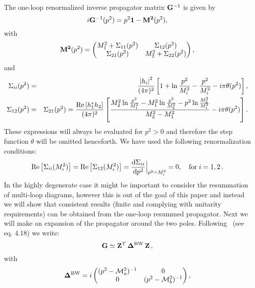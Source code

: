 \documentclass[11pt,a4paper]{article}
\providecommand{\dif}[0]{\mathrm{d}}
\providecommand{\abss}[1]{\left\lvert #1 \right\rvert^2}
\providecommand{\mire}[1]{{\rm Re} \left[ #1 \right]}
\providecommand{\cpm}[0]{\mathcal{M}}
\begin{document}
The one-loop renormalized inverse propagator matrix ${\bf G}^{-1}$ is given by 
 \begin{equation}
 \label{equation_Gdef}
 i {\bf G}^{-1}(p^2) = p^2 {\bf 1} - {\bf M^2}(p^2),
 \end{equation}
 with
 \begin{equation}
 {\bf M^2}(p^2)= 
\begin{pmatrix}
M_1^2 + \Sigma_{11}(p^2)  & \Sigma_{12}(p^2) \\
\Sigma_{21}(p^2)  & M_2^2 + \Sigma_{22}(p^2) 
\end{pmatrix},
\end{equation}
and
\begin{eqnarray}
\Sigma_{ii}(p^2)&=&\frac{\abss{h_i}}{(4\pi)^2} \left[1 + \ln \frac{p^2}{M_i^2} - \frac{p^2}{M_i^2} - i \pi \theta(p^2)\right], \\
\label{equation_sigma12}
\Sigma_{12}(p^2)&=&\Sigma_{21}(p^2)=\frac{\mire{h_1^* h_2}}{(4\pi)^2} \left[\frac{M_2^2 \ln \frac{p^2}{M_1^2} - M_1^2 \ln \frac{p^2}{M_2^2} - p^2 \ln \frac{M_2^2}{M_1^2}}{M_2^2-M_1^2} - i \pi \theta(p^2)\right] .
\end{eqnarray}
 These expressions will always be evaluated for $p^2 > 0$ and therefore the step function $\theta$ will be omitted henceforth. We have used the following renormalization conditions:
 \begin{equation*}
 \mire{\Sigma_{ii}(M_i^2)} = \mire{\Sigma_{12}(M_i^2)} = \frac{\dif \Sigma_{ii}}{\dif p^2}\Bigr\rvert_{p^2=M_i^2} = 0, \quad {\rm for} \; i=1,2\, . \\
\end{equation*}
In the highly degenerate case it might be important to consider the resummation of multi-loop diagrams, however this is out of the goal of this paper and instead we will show that consistent results (finite and complying with unitarity requirements) can be obtained from the one-loop resummed propagator.
Next we will make an expansion of the propagator around the two poles.
 Following~\cite{fuchs16} (see eq. 4.18) we write:
\begin{equation}
\label{equation_gaprox}
{\bf G} \simeq {\bf Z}^{T} \, {\bf \Delta}^{\rm BW} \, {\bf Z} \, ,
\end{equation}
with
\begin{equation}
\label{equation_bw}
{\bf \Delta}^{\rm BW} = i
\begin{pmatrix}
(p^2 - \cpm_{a}^2)^{-1} & 0 \\
0 & (p^2 - \cpm_{b}^2)^{-1} 
\end{pmatrix} ,
\end{equation}
\end{document}
